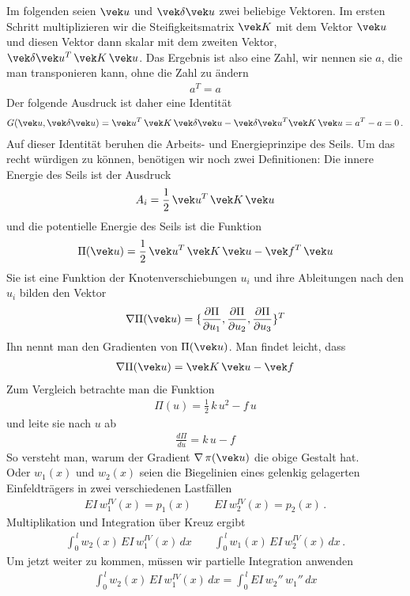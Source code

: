 Im folgenden seien $\vek u$ und $\vek \delta \vek u$ zwei beliebige Vektoren.  Im ersten Schritt multiplizieren wir die Steifigkeitsmatrix $\vek K $ mit dem Vektor $\vek u $ und diesen Vektor dann skalar mit dem zweiten Vektor, $\vek \delta \vek u^T\,\vek K\,\vek u$. Das Ergebnis ist also eine Zahl,  wir nennen sie $a$, die man transponieren kann, ohne die Zahl zu \"{a}ndern
\begin{align}
a^T = a
\end{align}
Der folgende Ausdruck ist daher eine Identit\"{a}t
\begin{align}
G(\vek u,\vek \delta \vek u) =  \vek u^T \,\vek K\,\vek \delta \vek u- \vek \delta \vek u^T\vek K\,\vek u = a^T - a = 0\,.
\end{align}
Auf dieser Identit\"{a}t beruhen die Arbeits- und Energieprinzipe des Seils. Um das recht w\"{u}rdigen zu k\"{o}nnen, ben\"{o}tigen wir noch zwei Definitionen: Die innere Energie des Seils ist der Ausdruck
\begin{align}
A_i = \frac{1}{2}\, \vek u^T\,\vek K\,\vek u
\end{align}
und die potentielle Energie des Seils ist die Funktion
\begin{align}
\Pi(\vek u)= \frac{1}{2}\, \vek u^T\,\vek K\,\vek u - \vek f^T\,\vek u
\end{align}
Sie ist eine Funktion der Knotenverschiebungen $u_i$ und ihre Ableitungen nach den $u_i$  bilden den Vektor
\begin{align}
\nabla \Pi(\vek u) = \{\frac{\partial \Pi}{\partial u_1}, \frac{\partial \Pi}{\partial u_2}, \frac{\partial \Pi}{\partial u_3}\}^T
\end{align}
Ihn nennt man den Gradienten von $\Pi(\vek u)$. Man findet leicht, dass
\begin{align}
\nabla \Pi(\vek u) = \vek K\,\vek u - \vek f
\end{align}
Zum Vergleich betrachte man die Funktion
\begin{align}
\Pi(u) = \frac{1}{2}\, k\,u^2 - f\,u
\end{align}
und leite sie nach $u$ ab
\begin{align}
\frac{d\Pi}{du} = k\,u - f
\end{align}
So versteht man, warum der Gradient $\nabla\,\pi(\vek u)$ die obige Gestalt hat.
\\

Oder $w_1(x)$ und $w_2(x)$ seien die Biegelinien eines gelenkig gelagerten Einfeldtr\"{a}gers in zwei verschiedenen Lastf\"{a}llen
\begin{align}
EI\,w_1^{IV}(x) = p_1(x) \qquad  EI\,w_2^{IV}(x) = p_2(x)\,.
\end{align}
Multiplikation und Integration \"{u}ber Kreuz ergibt
\begin{align}
\int_0^{\,l} w_2(x)\,EI\,w_1^{IV}(x) \,dx \qquad \int_0^{\,l} w_1(x)\,EI\,w_2^{IV}(x) \,dx\,.
\end{align}
Um jetzt weiter zu kommen, m\"{u}ssen wir partielle Integration anwenden
\begin{align}
\int_0^{\,l} w_2(x)\,EI\,w_1^{IV}(x) \,dx = \int_0^{\,l} EI\,w_2''\,w_1''\,dx
\end{align}\\

